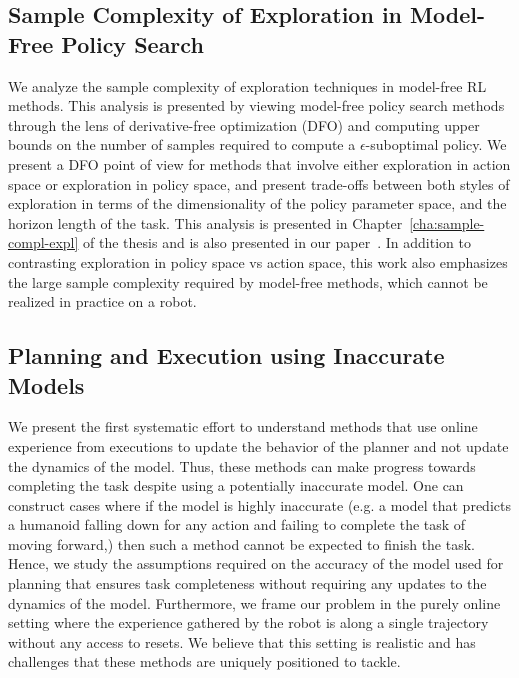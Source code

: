 \subsection{Sample Complexity of Exploration in Model-Free Policy
  Search}
\label{sec:sample-compl-expl}
We analyze the sample complexity of exploration techniques in
  model-free RL methods. This analysis is presented by viewing model-free policy
  search methods through the lens of derivative-free optimization (DFO)
  and computing upper bounds on the number of samples
  required to compute a $\epsilon$-suboptimal policy. We present a DFO
  point of view for methods that involve either exploration in action
  space or exploration in policy space, and present trade-offs between
  both styles of exploration in terms of the dimensionality of the
  policy parameter space, and the horizon length of the task. This
  analysis is presented in Chapter~\ref{cha:sample-compl-expl} of the  
  thesis and is also presented in our paper~\cite{aistats19}. In addition
  to contrasting exploration in policy space vs action space, this
  work also emphasizes the large sample complexity required by
  model-free methods, which cannot be realized in practice on a robot.
  
\subsection{Planning and Execution using Inaccurate Models}
\label{sec:plann-exec-using}
  We present the first systematic effort to understand methods
  that use online experience from executions to update the behavior of
  the planner and not update the dynamics of the model. Thus, these
  methods can make progress towards completing the task despite using
  a potentially inaccurate model. One can construct cases where if the
  model is highly inaccurate (e.g. a model that predicts a humanoid
  falling down for any action and failing to complete the task of
  moving forward,) then such a method cannot be expected to finish the
  task. Hence, we study the assumptions required on the accuracy of
  the model used for planning that ensures task completeness without
  requiring any updates to the dynamics of the model. Furthermore, we
  frame our problem in the purely online setting where the experience
  gathered by the robot is along a single trajectory without any
  access to resets. We believe that this setting is realistic and has
  challenges that these methods are uniquely positioned to tackle.

